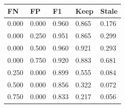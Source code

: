 \begin{tabular}{lllll}
\toprule
FN & FP & F1 & Keep & Stale \\
\midrule
0.000 & 0.000 & 0.960 & 0.865 & 0.176 \\
0.000 & 0.250 & 0.951 & 0.865 & 0.299 \\
0.000 & 0.500 & 0.960 & 0.921 & 0.293 \\
0.000 & 0.750 & 0.920 & 0.883 & 0.681 \\
0.250 & 0.000 & 0.899 & 0.555 & 0.084 \\
0.500 & 0.000 & 0.856 & 0.322 & 0.072 \\
0.750 & 0.000 & 0.833 & 0.217 & 0.056 \\
\bottomrule
\end{tabular}
